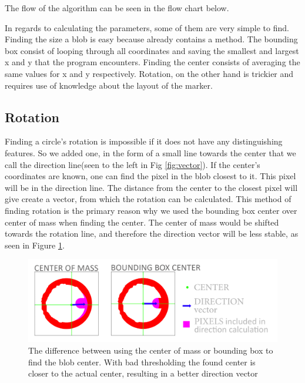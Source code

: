 The flow of the algorithm can be seen in the flow chart below.\\

In regards to calculating the parameters, some of them are very simple to find. Finding the size a blob is easy because  already contains a  method. The bounding box consist of looping through all coordinates and saving the smallest and largest x and y that the program encounters. Finding the center consists of averaging the same values for x and y respectively. Rotation, on the other hand is trickier and requires use of knowledge about the layout of the marker.
  
\subsection{Rotation}
Finding a circle's rotation is impossible if it does not have any distinguishing features. So we added one, in the form of a small line towards the center that we call the direction line(seen to the left in Fig \ref{fig:vector}). If the center's coordinates are known, one can find the pixel in the blob closest to it. This pixel will be in the direction line. The distance from the center to the closest pixel will give create a vector, from which the rotation can be calculated. This method of finding rotation is the primary reason why we used the bounding box center over center of mass when finding the center. The center of mass would be shifted towards the rotation line, and therefore the direction vector will be less stable, as seen in Figure \ref{fig:boundbox}.\\
\begin{figure}[H]
	\centering
	\includegraphics[width=1\linewidth]{figure/Analysis/boundingbox.png}
	\caption{The difference between using the center of mass or bounding box to find the blob center. With bad thresholding the found center is closer to the actual center, resulting in a better direction vector} 
	\label{fig:boundbox}
\end{figure}

